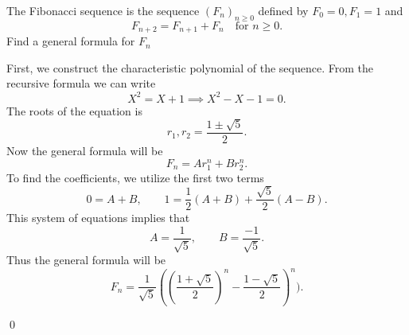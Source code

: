 \begin{problem}
	The Fibonacci sequence is the sequence $(F_n)_{n\geq0}$ defined by $F_0 = 0, F_1=1$ and 
	\[ F_{n+2} = F_{n+1} + F_n \quad \text{for } n\geq 0.  \]
	Find a general formula for $F_n$
\end{problem}
\begin{solution}
	First, we construct the characteristic polynomial of the sequence. From the recursive formula we can write
	\[ X^2 = X + 1 \implies \boxed{X^2 - X - 1 = 0}. \]
	The roots of the equation is 
	\[ r_1, r_2 = \frac{1 \pm \sqrt{5}}{2}. \]
	Now the general formula will be
	\[ F_n = Ar_1^n + Br_2^n. \] 
	To find the coefficients, we utilize the first two terms 
	\[ 0 = A + B, \qquad 1 = \frac{1}{2}(A+B) + \frac{\sqrt{5}}{2}(A-B). \]
	This system of equations implies that
	\[ A = \frac{1}{\sqrt{5}}, \qquad B=\frac{-1}{\sqrt{5}}.  \]
	Thus the general formula will be
	\[ \boxed{F_n = \frac{1}{\sqrt{5}}((\frac{1+\sqrt{5}}{2})^n - \frac{1-\sqrt{5}}{2})^n)}. \]
	
	\qed
	
\end{solution}


